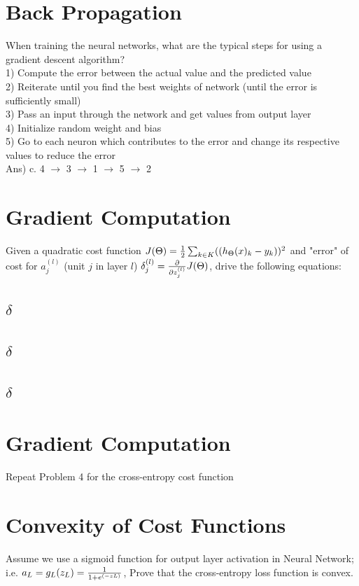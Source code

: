 \documentclass[12pt]{article}%
\begin{document}
\section{Back Propagation}
When training the neural networks, what are the typical steps for using a gradient descent algorithm?\\
1) Compute the error between the actual value and the predicted value\\
2) Reiterate until you find the best weights of network (until the error is sufficiently small)\\
3) Pass an input through the network and get values from output layer\\
4) Initialize random weight and bias\\
5) Go to each neuron which contributes to the error and change its respective values to reduce the error\\

Ans) c. 4 $\rightarrow$ 3 $\rightarrow$ 1 $\rightarrow$ 5 $\rightarrow$ 2

\section{Gradient Computation}
Given a quadratic cost function $J(\Theta) = {1 \over 2} \sum_{k \in K} ((h_\Theta (x)_k - y_k ))^2$ and  "error" of cost for $a^{(l)}_j$ (unit $j$ in layer $l$) $\delta^{(l)}_j = {\partial \over {\partial z^{(l)}_j}} J(\Theta)$, drive the following equations:
\subsection{$\delta$}
\subsection{$\delta$}
\subsection{$\delta$}

\section{Gradient Computation}
Repeat Problem 4 for the cross-entropy cost function

\section{Convexity of Cost Functions}
Assume we use a sigmoid function for output layer activation in Neural Network; i.e. $a_L = g_L (z_L ) = {1 \over {1 + e^{(-zL)}}}$, Prove that the cross-entropy loss function is convex.
\end{document}
